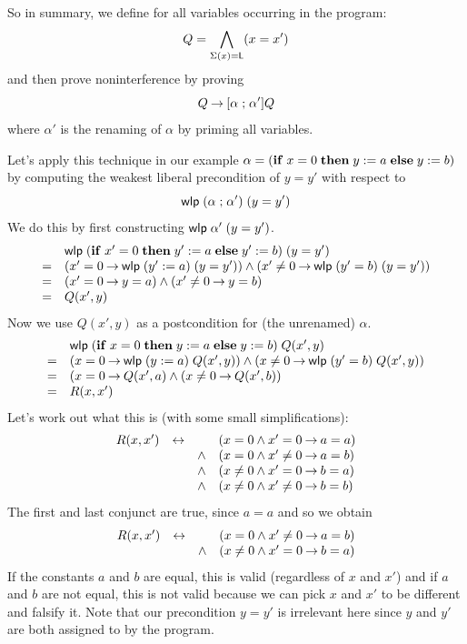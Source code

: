 \documentclass[11pt]{article}
\begin{document}
So in summary, we define for all variables occurring in the program:
\[
  Q = \bigwedge_{\Sigma(x) = \mathsf{L}} (x = x')
\]
and then prove noninterference by proving
\[
  Q \mathbin{\rightarrow} [\alpha \mathrel{;} \alpha']Q
\]
where $\alpha'$ is the renaming of $\alpha$ by priming all variables.

Let's apply this technique in our example
$\alpha = (\mathbf{if}\; x = 0\; \mathbf{then}\; y := a\; \mathbf{else}\; y := b)$ by
computing the weakest liberal precondition of $y = y'$ with respect to
\[
  \mathsf{wlp}\; (\alpha \mathrel{;} \alpha')\; (y = y')
\]
We do this by first constructing $\mathsf{wlp}\; \alpha'\; (y = y')$.
\[
  \begin{array}{ll}
    & \mathsf{wlp}\;  (\mathbf{if}\; x' = 0\; \mathbf{then}\; y' := a\; \mathbf{else}\; y' := b)\; (y = y') \\
    = & (x' = 0 \mathbin{\rightarrow} \mathsf{wlp}\; (y' := a)\; (y = y'))
        \land (x' \neq 0 \mathbin{\rightarrow} \mathsf{wlp}\; (y' = b)\; (y = y')) \\
    = & (x' = 0 \mathbin{\rightarrow} y = a) \land (x' \neq 0 \mathbin{\rightarrow} y = b) \\
    = & Q(x', y)
  \end{array}
\]
Now we use $Q(x', y)$ as a postcondition for (the unrenamed) $\alpha$.
\[
  \begin{array}{ll}
    & \mathsf{wlp}\;  (\mathbf{if}\; x = 0\; \mathbf{then}\; y := a\; \mathbf{else}\; y := b)\; Q(x', y) \\
    = & (x = 0 \mathbin{\rightarrow} \mathsf{wlp}\; (y := a)\; Q(x',y))
        \land (x \neq 0 \mathbin{\rightarrow} \mathsf{wlp}\; (y' = b)\; Q(x',y)) \\
    = & (x = 0 \mathbin{\rightarrow} Q(x',a) \land (x \neq 0 \mathbin{\rightarrow} Q(x',b)) \\
    = & R(x, x')
  \end{array}
\]
Let's work out what this is (with some small simplifications):
\[
  \begin{array}{lccl}
    R(x,x') & \leftrightarrow &  & (x = 0 \land x' = 0 \mathbin{\rightarrow} a = a) \\
            & & \land & (x = 0 \land x' \neq 0 \mathbin{\rightarrow} a = b) \\
            & & \land & (x \neq 0 \land x' = 0 \mathbin{\rightarrow} b = a) \\
            & & \land & (x \neq 0 \land x' \neq 0 \mathbin{\rightarrow} b = b)
  \end{array}
\]
The first and last conjunct are true, since $a = a$ and so we obtain
\[
  \begin{array}{lccl}
    R(x,x') & \leftrightarrow &  & (x = 0 \land x' \neq 0 \mathbin{\rightarrow} a = b) \\
            & & \land & (x \neq 0 \land x' = 0 \mathbin{\rightarrow} b = a)
  \end{array}
\]
If the constants $a$ and $b$ are equal, this is valid (regardless of $x$ and
$x'$) and if $a$ and $b$ are not equal, this is not valid because we can pick
$x$ and $x'$ to be different and falsify it.  Note that our precondition
$y = y'$ is irrelevant here since $y$ and $y'$ are both assigned to by the
program.
\end{document}

